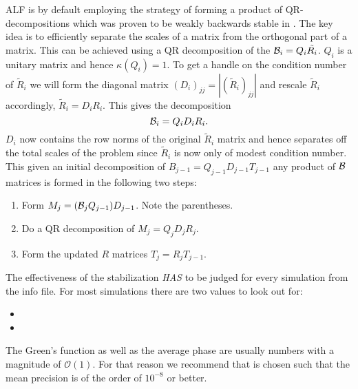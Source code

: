 ALF is by default employing
the strategy of forming a product of QR-decompositions which was proven to be weakly backwards stable in \cite{Bai2011}.
The key idea is to efficiently separate the scales of a matrix from the orthogonal part of a matrix.
This can be achieved using a QR decomposition of the ${\cal B}_i = Q_i \tilde{R_i}$. $Q_i$ is a unitary matrix and hence $\kappa(Q_i) = 1$.
To get a handle on the condition number of $\tilde{R}_i$ we will form the
diagonal matrix $(D_i)_{jj} = |(\tilde{R}_i)_{jj}|$ and rescale $\tilde{R}_i$ accordingly, $\tilde{R}_i = D_i R_i$.
This gives the decomposition
\begin{equation}
{\cal B}_i = Q_i D_i R_i.
\end{equation}
$D_i$ now contains the row norms of the original $\tilde{R}_i$ matrix and hence separates off the total scales of the problem since $\tilde{R}_i$ is now only of modest condition number.  
This given an initial decomposition of $B_{j-1} = Q_{j-1} D_{j-1} T_{j-1}$ any product 
of ${\cal B}$ matrices is formed in the following two steps:
\begin{enumerate}
\item Form $ M_j = ({\cal B}_j Q_{j-1}) D_{j-1}$. Note the parentheses.
\item Do a QR decomposition of $M_j = Q_j D_j R_j$.
\item Form the updated $R$ matrices $T_j = R_j T_{j-1}$.
\end{enumerate}
The effectiveness of the stabilization \emph{HAS} to be judged for every simulation from the info
file. For most simulations there are two values to look out for:
\begin{itemize}
\item {}
\item {}
\end{itemize}
The Green's function as well as the average phase are usually numbers with a magnitude of $\mathcal{O} (1)$. 
For that reason we recommend that  is chosen such that the mean precision is  of the order of $10^{-8}$  or better.  

